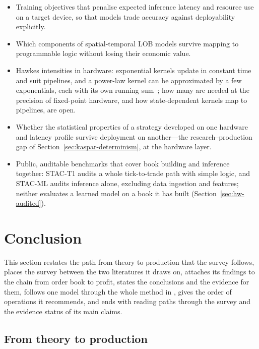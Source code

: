 \begin{itemize}[leftmargin=1.5em,itemsep=1pt]
\item Training objectives that penalise expected inference latency and resource use on a target
  device, so that models trade accuracy against deployability explicitly.
\item Which components of spatial-temporal LOB models survive mapping to programmable logic without
  losing their economic value.
\item Hawkes intensities in hardware: exponential kernels update in constant time and suit pipelines,
  and a power-law kernel can be approximated by a few exponentials, each with its own running
  sum~\citep{bochud2007}; how many are needed at the precision of fixed-point hardware, and how
  state-dependent kernels map to pipelines, are open.
\item Whether the statistical properties of a strategy developed on one hardware and latency profile
  survive deployment on another---the research--production gap of Section~\ref{sec:kaspar-determinism}, at the hardware layer.
\item Public, auditable benchmarks that cover book building and inference together: STAC-T1 audits a whole
  tick-to-trade path with simple logic, and STAC-ML audits inference alone, excluding data ingestion and features;
  neither evaluates a learned model on a book it has built (Section~\ref{sec:hw-audited}).
\end{itemize}

\section{Conclusion}
\label{sec:conclusion}

This section restates the path from theory to production that the survey follows, places the survey between the two
literatures it draws on, attaches its findings to the chain from
order book to profit, states the conclusions and the evidence for them, follows one model through the whole method in
\kasparhft{}, gives the order of operations it recommends, and ends with reading paths through the survey and the evidence
status of its main claims.

\subsection{From theory to production}
\label{sec:theory-to-production}

